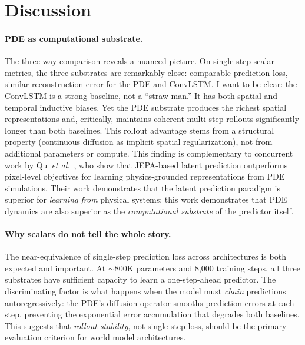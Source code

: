 \documentclass{article}
\newcommand{\etal}{\textit{et al.}}
\begin{document}
\section{Discussion}
\label{sec:discussion}

\paragraph{PDE as computational substrate.}
The three-way comparison reveals a nuanced picture. On single-step scalar metrics, the three substrates are remarkably close: comparable prediction loss, similar reconstruction error for the PDE and ConvLSTM. I want to be clear: the ConvLSTM is a strong baseline, not a ``straw man.'' It has both spatial and temporal inductive biases. Yet the PDE substrate produces the richest spatial representations and, critically, maintains coherent multi-step rollouts significantly longer than both baselines. This rollout advantage stems from a structural property (continuous diffusion as implicit spatial regularization), not from additional parameters or compute. This finding is complementary to concurrent work by Qu~\etal{}~\cite{qu2026representation}, who show that JEPA-based latent prediction outperforms pixel-level objectives for learning physics-grounded representations from PDE simulations. Their work demonstrates that the latent prediction paradigm is superior for \emph{learning from} physical systems; this work demonstrates that PDE dynamics are also superior as the \emph{computational substrate} of the predictor itself.

\paragraph{Why scalars do not tell the whole story.}
The near-equivalence of single-step prediction loss across architectures is both expected and important. At $\sim$800K parameters and 8,000 training steps, all three substrates have sufficient capacity to learn a one-step-ahead predictor. The discriminating factor is what happens when the model must \emph{chain} predictions autoregressively: the PDE's diffusion operator smooths prediction errors at each step, preventing the exponential error accumulation that degrades both baselines. This suggests that \emph{rollout stability}, not single-step loss, should be the primary evaluation criterion for world model architectures.
\end{document}
